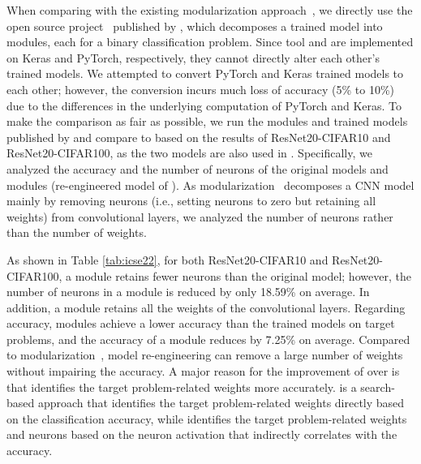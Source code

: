 When comparing \projectName with the existing modularization approach~\cite{nnmodularity2022icse}, we directly use the open source project~\cite{modularization} published by \cite{nnmodularity2022icse}, which decomposes a trained model into modules, each for a binary classification problem.
Since tool \cite{nnmodularity2022icse} and \projectName are implemented on Keras and PyTorch, respectively, they cannot directly alter each other's trained models. 
We attempted to convert PyTorch and Keras trained models to each other; however, the conversion incurs much loss of accuracy (5\% to 10\%) due to the differences in the underlying computation of PyTorch and Keras.
To make the comparison as fair as possible, we run the modules and trained models published by \cite{nnmodularity2022icse} and compare \projectName to \cite{nnmodularity2022icse} based on the results of ResNet20-CIFAR10 and ResNet20-CIFAR100, as the two models are also used in \cite{nnmodularity2022icse}.
Specifically, we analyzed the accuracy and the number of neurons of the original models and modules (re-engineered model of \projectName). 
As modularization~\cite{nnmodularity2022icse} decomposes a CNN model mainly by removing neurons (i.e., setting neurons to zero but retaining all weights) from convolutional layers, we analyzed the number of neurons rather than the number of weights.



As shown in Table \ref{tab:icse22}, for both ResNet20-CIFAR10 and ResNet20-CIFAR100, a module retains fewer neurons than the original model; however, the number of neurons in a module is reduced by only 18.59\% on average. In addition, a module retains all the weights of the convolutional layers.
Regarding accuracy, modules achieve a lower accuracy than the trained models on target problems, and the accuracy of a module reduces by 7.25\% on average. 
Compared to modularization~\cite{nnmodularity2022icse}, model re-engineering can remove a large number of weights without impairing the accuracy.
A major reason for the improvement of \projectName over \cite{nnmodularity2022icse} is that \projectName identifies the target problem-related weights more accurately.
\projectName is a search-based approach that identifies the target problem-related weights directly based on the classification accuracy, while \cite{nnmodularity2022icse} identifies the target problem-related weights and neurons based on the neuron activation that indirectly correlates with the accuracy.

